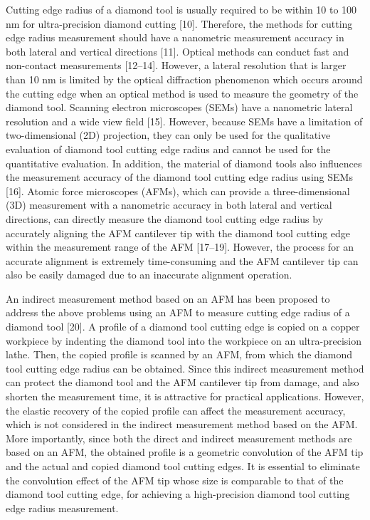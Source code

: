 \documentclass{article}
\begin{document}
Cutting edge radius of a diamond tool is usually required to be within 10 to 100 nm for ultra-precision diamond cutting [10]. Therefore, the methods for cutting edge radius measurement should have a nanometric measurement accuracy in both lateral and vertical directions [11]. Optical methods can conduct fast and non-contact measurements [12–14]. However, a lateral resolution that is larger than 10 nm is limited by the optical diffraction phenomenon which occurs around the cutting edge when an optical method is used to measure the geometry of the diamond tool. Scanning electron microscopes (SEMs) have a nanometric lateral resolution and a wide view field [15]. However, because SEMs have a limitation of two-dimensional (2D) projection, they can only be used for the qualitative evaluation of diamond tool cutting edge radius and cannot be used for the quantitative evaluation. In addition, the material of diamond tools also influences the measurement accuracy of the diamond tool cutting edge radius using SEMs [16]. Atomic force microscopes (AFMs), which can provide a three-dimensional (3D) measurement with a nanometric accuracy in both lateral and vertical directions, can directly measure the diamond tool cutting edge radius by accurately aligning the AFM cantilever tip with the diamond tool cutting edge within the measurement range of the AFM [17–19]. However, the process for an accurate alignment is extremely time-consuming and the AFM cantilever tip can also be easily damaged due to an inaccurate alignment operation.

An indirect measurement method based on an AFM has been proposed to address the above problems using an AFM to measure cutting edge radius of a diamond tool [20]. A profile of a diamond tool cutting edge is copied on a copper workpiece by indenting the diamond tool into the workpiece on an ultra-precision lathe. Then, the copied profile is scanned by an AFM, from which the diamond tool cutting edge radius can be obtained. Since this indirect measurement method can protect the diamond tool and the AFM cantilever tip from damage, and also shorten the measurement time, it is attractive for practical applications. However, the elastic recovery of the copied profile can affect the measurement accuracy, which is not considered in the indirect measurement method based on the AFM. More importantly, since both the direct and indirect measurement methods are based on an AFM, the obtained profile is a geometric convolution of the AFM tip and the actual and copied diamond tool cutting edges. It is essential to eliminate the convolution effect of the AFM tip whose size is comparable to that of the diamond tool cutting edge, for achieving a high-precision diamond tool cutting edge radius measurement.
\end{document}
